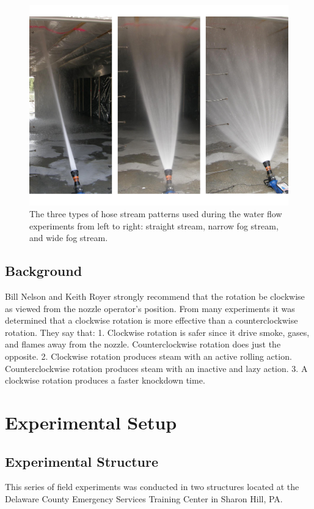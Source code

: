 \documentclass[12pt,oneside]{book}
\begin{document}
\begin{figure}[!ht]
\includegraphics[width=6in]{../Pictures/hose_streams.pdf}
\caption[Different Hose Stream Patterns]{The three types of hose stream patterns used during the water flow experiments from left to right: straight stream, narrow fog stream, and wide fog stream.}
\label{fig:hose_streams}
\end{figure}
\FloatBarrier

\section{Background}
\label{sec:Background}
Bill Nelson and Keith Royer strongly recommend that the rotation be clockwise as viewed from the nozzle operator’s position. From many experiments it was determined that a clockwise rotation is more effective than a counterclockwise rotation. They say that:
1. Clockwise rotation is safer since it drive smoke, gases, and flames away from the nozzle.
Counterclockwise rotation does just the opposite.
2. Clockwise rotation produces steam with an active rolling action. Counterclockwise rotation
produces steam with an inactive and lazy action.
3. A clockwise rotation produces a faster knockdown time.

\chapter{Experimental Setup}
\label{chap:Experimental_Setup}

\section{Experimental Structure}
\label{sec:Experimental_Structure}
This series of field experiments was conducted in two structures located at the Delaware County Emergency Services Training Center in Sharon Hill, PA. 
\end{document}
